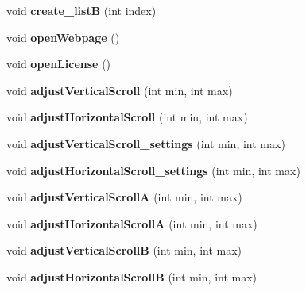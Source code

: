 \begin{DoxyCompactItemize}
\item 
\hypertarget{classofeli_1_1_image_viewer_a89dd25a28e42b5943712046f21c102d0}{void {\bfseries create\-\_\-list\-B} (int index)}\label{classofeli_1_1_image_viewer_a89dd25a28e42b5943712046f21c102d0}

\item 
\hypertarget{classofeli_1_1_image_viewer_a561d12c93acb47f472e0ae180001afc5}{void {\bfseries open\-Webpage} ()}\label{classofeli_1_1_image_viewer_a561d12c93acb47f472e0ae180001afc5}

\item 
\hypertarget{classofeli_1_1_image_viewer_a4457774053d70de9eddc230f02aa6b5f}{void {\bfseries open\-License} ()}\label{classofeli_1_1_image_viewer_a4457774053d70de9eddc230f02aa6b5f}

\item 
\hypertarget{classofeli_1_1_image_viewer_ab360a7c05db70837e1ac2a328fa9a096}{void {\bfseries adjust\-Vertical\-Scroll} (int min, int max)}\label{classofeli_1_1_image_viewer_ab360a7c05db70837e1ac2a328fa9a096}

\item 
\hypertarget{classofeli_1_1_image_viewer_a7539b4c0185b55d51c33cec8b9c4899a}{void {\bfseries adjust\-Horizontal\-Scroll} (int min, int max)}\label{classofeli_1_1_image_viewer_a7539b4c0185b55d51c33cec8b9c4899a}

\item 
\hypertarget{classofeli_1_1_image_viewer_a7550a79a25130c81e44650c7b0b5dcbc}{void {\bfseries adjust\-Vertical\-Scroll\-\_\-settings} (int min, int max)}\label{classofeli_1_1_image_viewer_a7550a79a25130c81e44650c7b0b5dcbc}

\item 
\hypertarget{classofeli_1_1_image_viewer_a2bf77639e27562c2e32cd7c18d4653de}{void {\bfseries adjust\-Horizontal\-Scroll\-\_\-settings} (int min, int max)}\label{classofeli_1_1_image_viewer_a2bf77639e27562c2e32cd7c18d4653de}

\item 
\hypertarget{classofeli_1_1_image_viewer_a6e5cdde2aa31f9a32bba3362a9b83beb}{void {\bfseries adjust\-Vertical\-Scroll\-A} (int min, int max)}\label{classofeli_1_1_image_viewer_a6e5cdde2aa31f9a32bba3362a9b83beb}

\item 
\hypertarget{classofeli_1_1_image_viewer_a33c670d021ee9c818771c08c1789056b}{void {\bfseries adjust\-Horizontal\-Scroll\-A} (int min, int max)}\label{classofeli_1_1_image_viewer_a33c670d021ee9c818771c08c1789056b}

\item 
\hypertarget{classofeli_1_1_image_viewer_a86b807dbbba090104ad2f9c84fdebc14}{void {\bfseries adjust\-Vertical\-Scroll\-B} (int min, int max)}\label{classofeli_1_1_image_viewer_a86b807dbbba090104ad2f9c84fdebc14}

\item 
\hypertarget{classofeli_1_1_image_viewer_a896028502ad1fd86a0c8a90f6203a158}{void {\bfseries adjust\-Horizontal\-Scroll\-B} (int min, int max)}\label{classofeli_1_1_image_viewer_a896028502ad1fd86a0c8a90f6203a158}

\end{DoxyCompactItemize}
